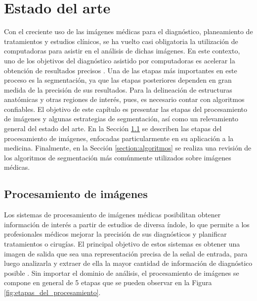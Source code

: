\chapter{Estado del arte}\label{chapter:estado_del_arte}
Con el creciente uso de las imágenes médicas para el diagnóstico, planeamiento de tratamientos y estudios clínicos, se ha vuelto casi obligatoria la utilización de computadoras para asistir en el análisis de dichas imágenes. En este contexto, uno de los objetivos del diagnóstico asistido por computadoras es acelerar la obtención de resultados precisos \citep{Sharma2010}. Una de las etapas más importantes en este proceso es la segmentación, ya que las etapas posteriores dependen en gran medida de la precisión de sus resultados. Para la delineación de estructuras anatómicas y otras regiones de interés, pues, es necesario contar con algoritmos confiables.
El objetivo de este capítulo es presentar las etapas del procesamiento de imágenes y algunas estrategias de segmentación, así como un relevamiento general del estado del arte. En la Sección \ref{section:procesamiento} se describen las etapas del procesamiento de imágenes, enfocadas particularmente en su aplicación a la medicina. Finalmente, en la Sección \ref{section:algoritmos} se realiza una revisión de los algoritmos de segmentación más comúnmente utilizados sobre imágenes médicas.

\section{Procesamiento de imágenes}\label{section:procesamiento}
Los sistemas de procesamiento de imágenes médicas posibilitan obtener información de interés a partir de estudios de diversa índole, lo que permite a los profesionales médicos mejorar la precisión de sus diagnósticos y planificar tratamientos o cirugías. El principal objetivo de estos sistemas es obtener una imagen de salida que sea una representación precisa de la señal de entrada, para luego analizarla y extraer de ella la mayor cantidad de información de diagnóstico posible \citep{dougherty2009digital}. Sin importar el dominio de análisis, el procesamiento de imágenes se compone en general de 5 etapas que se pueden observar en la Figura \ref{fig:etapas_del_procesamiento}.

